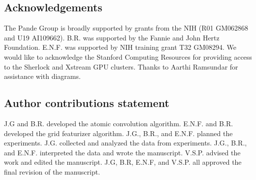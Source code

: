 \subsection{Acknowledgements}

The Pande Group is broadly supported by grants from the NIH (R01 GM062868 and U19 AI109662).  B.R. was supported by the Fannie and John Hertz Foundation. E.N.F. was supported by NIH training grant T32 GM08294.  We would like to acknowledge the Stanford Computing Resources for providing access to the Sherlock and Xstream GPU clusters. Thanks to Aarthi Ramsundar for assistance with diagrams.

\subsection{Author contributions statement}
J.G and B.R. developed the atomic convolution algorithm.  E.N.F. and B.R. developed the grid featurizer algorithm.  J.G., B.R., and E.N.F. planned the experiments.  J.G. collected and analyzed the data from experiments. J.G., B.R., and E.N.F. interpreted the data and wrote the manuscript.  V.S.P. advised the work and edited the manuscript.  J.G, B.R, E.N.F, and V.S.P. all approved the final revision of the manuscript.
